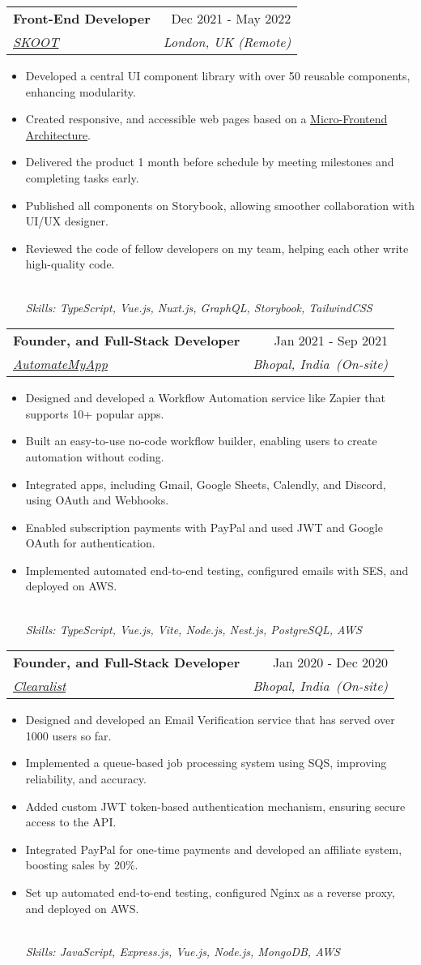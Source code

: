 \documentclass[letterpaper,12pt]{article}
\makeatletter
\newcommand{\resumeItem}[1]{
  \item\small{#1}\vspace{-2pt}
}
\newcommand{\resumeSubheading}[4]{
  \vspace{-2pt}\item
    \begin{tabular*}{0.97\textwidth}[t]{l@{\extracolsep{\fill}}r}
      \textbf{#1} & \small{#2} \\
      \textit{\small{#3}} & \textit{\small{#4}} \\
    \end{tabular*}\vspace{-5pt}
}
\newcommand{\resumeItemFooter}[1]{
    \\ \vspace{7pt}\hspace{-0.35in}\footnotesize\emph{#1}
}
\newcommand{\resumeItemListStart}{\begin{itemize}}
\newcommand{\resumeItemListEnd}{\end{itemize}\vspace{-5pt}}
\def\myHometown{Bhopal, India}
\def\skootLink{https://skoot.eco}
\def\automateMyAppLink{https://automatemyapp.com}
\def\clearalistLink{https://clearalist.com}
\def\microFrontendLink{https://micro-frontends.org}
\makeatother
\begin{document}
\resumeSubheading
{Front-End Developer}{Dec 2021 - May 2022}
{\href{\skootLink}{\color{blue}SKOOT}}{London, UK (Remote)}
\resumeItemListStart
\resumeItem{Developed a central UI component library with over 50 reusable components, enhancing modularity.}
\resumeItem{Created responsive, and accessible web pages based on a \href{\microFrontendLink}{\color{blue}Micro-Frontend Architecture}.}
\resumeItem{Delivered the product 1 month before schedule by meeting milestones and completing tasks early.}
\resumeItem{Published all components on Storybook, allowing smoother collaboration with UI/UX designer.}
\resumeItem{Reviewed the code of fellow developers on my team, helping each other write high-quality code.}
\resumeItemFooter{Skills: TypeScript, Vue.js, Nuxt.js, GraphQL, Storybook, TailwindCSS}
\resumeItemListEnd

\resumeSubheading
{Founder, and Full-Stack Developer}{Jan 2021 - Sep 2021}
{\href{\automateMyAppLink}{\color{blue}AutomateMyApp}}{\myHometown\ (On-site)}
\resumeItemListStart
\resumeItem{Designed and developed a Workflow Automation service like Zapier that supports 10+ popular apps.}
\resumeItem{Built an easy-to-use no-code workflow builder, enabling users to create automation without coding.}
\resumeItem{Integrated apps, including Gmail, Google Sheets, Calendly, and Discord, using OAuth and Webhooks.}
\resumeItem{Enabled subscription payments with PayPal and used JWT and Google OAuth for authentication.}
\resumeItem{Implemented automated end-to-end testing, configured emails with SES, and deployed on AWS.}
\resumeItemFooter{Skills: TypeScript, Vue.js, Vite, Node.js, Nest.js, PostgreSQL, AWS}
\resumeItemListEnd

\resumeSubheading
{Founder, and Full-Stack Developer}{Jan 2020 - Dec 2020}
{\href{\clearalistLink}{\color{blue}Clearalist}}{\myHometown\ (On-site)}
\resumeItemListStart
\resumeItem{Designed and developed an Email Verification service that has served over 1000 users so far.}
\resumeItem{Implemented a queue-based job processing system using SQS, improving reliability, and accuracy.}
\resumeItem{Added custom JWT token-based authentication mechanism, ensuring secure access to the API.}
\resumeItem{Integrated PayPal for one-time payments and developed an affiliate system, boosting sales by 20\%.}
\resumeItem{Set up automated end-to-end testing, configured Nginx as a reverse proxy, and deployed on AWS.}
\resumeItemFooter{Skills: JavaScript, Express.js, Vue.js, Node.js, MongoDB, AWS}
\resumeItemListEnd
\end{document}
